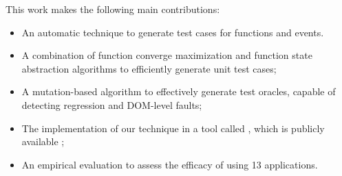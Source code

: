 %


This work makes the following main contributions:
\begin{itemize}

\item An automatic technique to generate test cases for \javascript functions and events.

\item A combination of function converge maximization and function state abstraction algorithms to efficiently generate unit test cases;
\item A mutation-based algorithm to effectively generate test oracles, capable of detecting regression \javascript and DOM-level faults;%
\item The implementation of our technique in a tool called \tool, which is publicly available \cite{jseft-dl};%
\item An empirical evaluation to assess the efficacy of \tool using 13 \javascript applications.
\end{itemize} 

